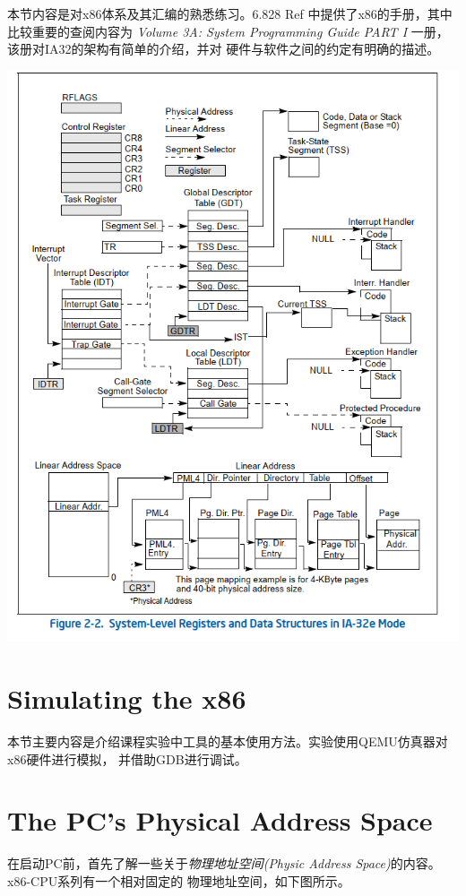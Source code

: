 \documentclass[12pt, letterpaper]{report}
\begin{document}
本节内容是对x86体系及其汇编的熟悉练习。6.828 Ref 中提供了x86的手册，其中比较重要的查阅内容为
 \textsl{Volume 3A: System Programming Guide PART I} 一册，该册对IA32的架构有简单的介绍，并对
硬件与软件之间的约定有明确的描述。\par 
\quad \par
{
\includegraphics[width=\textwidth,height=0.7\textheight]{IA32-syslevel}
}
\quad \par
\section[\large Simulating the x86]{Simulating the x86}
本节主要内容是介绍课程实验中工具的基本使用方法。实验使用QEMU仿真器对x86硬件进行模拟，
并借助GDB进行调试。

\section[\large The PC's Physical Address Space]{The PC's Physical Address Space}
在启动PC前，首先了解一些关于\textsl{物理地址空间(Physic Address Space)}的内容。x86-CPU系列有一个相对固定的
物理地址空间，如下图所示。\par
\end{document}
